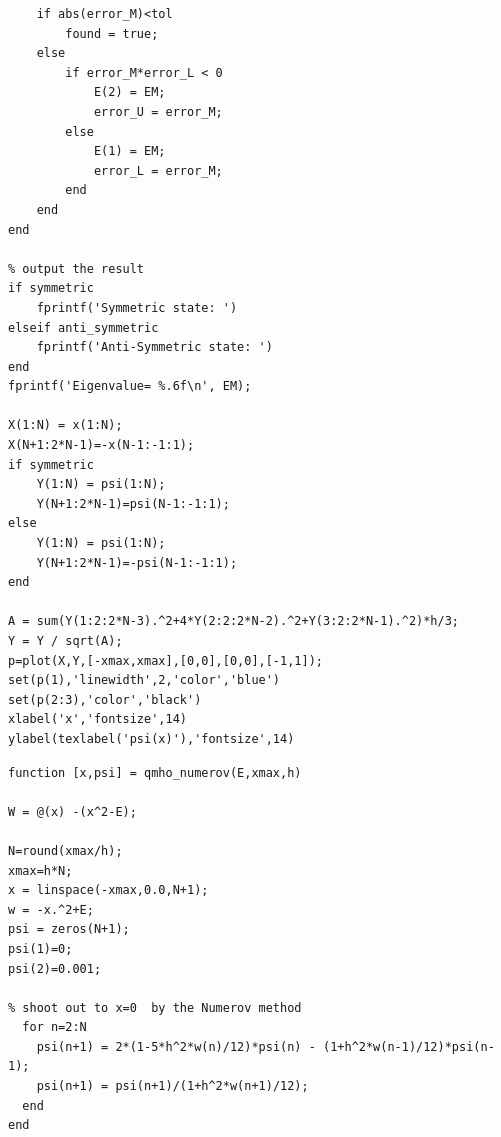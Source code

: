 \begin{verbatim}
    if abs(error_M)<tol
        found = true;
    else
        if error_M*error_L < 0
            E(2) = EM;
            error_U = error_M;
        else
            E(1) = EM;
            error_L = error_M;
        end
    end
end

% output the result
if symmetric
    fprintf('Symmetric state: ')
elseif anti_symmetric
    fprintf('Anti-Symmetric state: ')
end
fprintf('Eigenvalue= %.6f\n', EM);

X(1:N) = x(1:N);
X(N+1:2*N-1)=-x(N-1:-1:1);
if symmetric
    Y(1:N) = psi(1:N);
    Y(N+1:2*N-1)=psi(N-1:-1:1);
else
    Y(1:N) = psi(1:N);
    Y(N+1:2*N-1)=-psi(N-1:-1:1);
end

A = sum(Y(1:2:2*N-3).^2+4*Y(2:2:2*N-2).^2+Y(3:2:2*N-1).^2)*h/3;
Y = Y / sqrt(A);
p=plot(X,Y,[-xmax,xmax],[0,0],[0,0],[-1,1]);
set(p(1),'linewidth',2,'color','blue')
set(p(2:3),'color','black')
xlabel('x','fontsize',14)
ylabel(texlabel('psi(x)'),'fontsize',14)
\end{verbatim}

\begin{verbatim}
function [x,psi] = qmho_numerov(E,xmax,h)

W = @(x) -(x^2-E);

N=round(xmax/h);
xmax=h*N;
x = linspace(-xmax,0.0,N+1);
w = -x.^2+E;
psi = zeros(N+1);
psi(1)=0;
psi(2)=0.001;

% shoot out to x=0  by the Numerov method
  for n=2:N
    psi(n+1) = 2*(1-5*h^2*w(n)/12)*psi(n) - (1+h^2*w(n-1)/12)*psi(n-1);
    psi(n+1) = psi(n+1)/(1+h^2*w(n+1)/12);
  end
end
\end{verbatim}

\normalsize
{}

